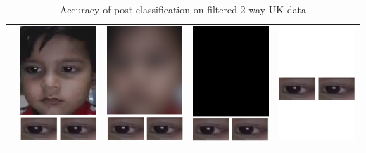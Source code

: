 \begin{table}[h]
  \centering
    \caption{Accuracy of post-classification on filtered 2-way UK data}
    \label{tab:2way_postClassif_UK}
    \begin{tabular}{|c||c|c|c|c|}
      \hline
         & \includegraphics[scale=0.2,valign=m]{GazePreservingRedaction/No_redaction} & \includegraphics[scale=0.2,valign=m]{GazePreservingRedaction/Face_blurred} & \includegraphics[scale=0.2,valign=m]{GazePreservingRedaction/Face_blacked} & \includegraphics[scale=0.2,valign=m]{GazePreservingRedaction/No_face} \\

\end{tabular}
\end{table}
